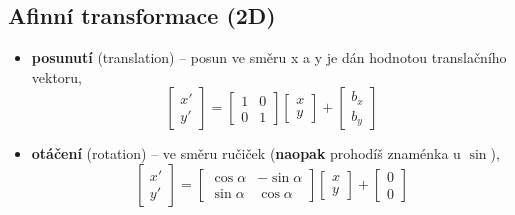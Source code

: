 \subsection{Afinní transformace (2D)}
\begin{itemize}
    \item \textbf{posunutí} (translation) -- posun ve směru x a y je dán hodnotou translačního vektoru,
          \begin{equation*}
              \begin{bmatrix}
                  x' \\[0.3em]
                  y'
              \end{bmatrix} =
              \begin{bmatrix}
                  1 & 0 \\[0.3em]
                  0 & 1
              \end{bmatrix}
              \begin{bmatrix}
                  x \\[0.3em]
                  y
              \end{bmatrix} +
              \begin{bmatrix}
                  b_x \\[0.3em]
                  b_y
              \end{bmatrix}
          \end{equation*}
    \item \textbf{otáčení} (rotation) -- ve směru ručiček (\textbf{naopak} prohodíš znaménka u $\sin$),
          \begin{equation*}
              \begin{bmatrix}
                  x' \\[0.3em]
                  y'
              \end{bmatrix} =
              \begin{bmatrix}
                  \cos{\alpha} & -\sin{\alpha} \\[0.3em]
                  \sin{\alpha} & \cos{\alpha}
              \end{bmatrix}
              \begin{bmatrix}
                  x \\[0.3em]
                  y
              \end{bmatrix} +
              \begin{bmatrix}
                  0 \\[0.3em]
                  0
              \end{bmatrix}

\end{equation*}
\end{itemize}
